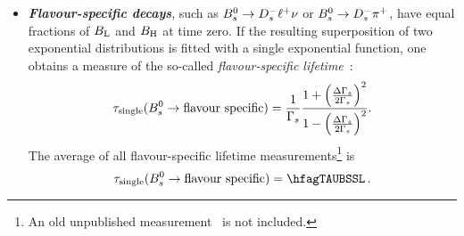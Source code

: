 \afterpage{\clearpage}

\begin{itemize}
\item 
{\bf\em Flavour-specific decays},
such as $B^0_s \to D_s^- \ell^+ \nu$
or $B^0_s\to D_s^- \pi^+$, have equal 
fractions of $B_{\rm L}$ and $B_{\rm H}$ at time zero. 
If the resulting superposition of two exponential distributions
is fitted with a single exponential function, 
one obtains a measure of the so-called {\em flavour-specific lifetime}~\cite{Hartkorn:1999ga}:
\begin{equation}
\tau_{\rm single}(\Bs\to \mbox{flavour specific}) = \frac{1}{\Gs}
\frac{{1+\left(\frac{\DGs}{2\Gs}\right)^2}}{{1-\left(\frac{\DGs}{2\Gs}\right)^2}
}.
\labe{fslife}
\end{equation}
The average of all flavour-specific 
\Bs lifetime measurements\footnote{
An old unpublished measurement~\cite{CDFnote7757:2005} is not included.}
is
\begin{equation}
\tau_{\rm single}(\Bs\to \mbox{flavour specific}) = \hfagTAUBSSL \,.
\labe{tau_fs}
\end{equation}


\end{itemize}
